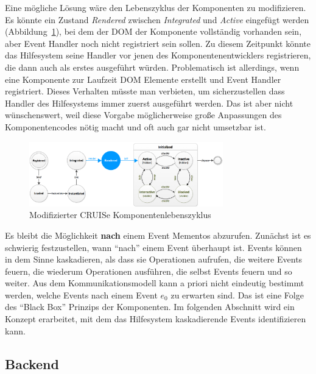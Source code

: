 \documentclass[
	headsepline,
	footsepline,
	fontsize=12pt,
	bibliography=totoc
]{scrbook}
\begin{document}
Eine mögliche Lösung wäre den Lebenszyklus der Komponenten zu modifizieren. Es könnte ein Zustand \emph{Rendered} zwischen \emph{Integrated} und \emph{Active} eingefügt werden (Abbildung~\ref{figure:cruise-lifecycle}), bei dem der DOM der Komponente vollständig vorhanden sein, aber Event Handler noch nicht registriert sein sollen. Zu diesem Zeitpunkt könnte das Hilfesystem seine Handler vor jenen des Komponentenentwicklers registrieren, die dann auch als erstes ausgeführt würden. Problematisch ist allerdings, wenn eine Komponente zur Laufzeit DOM Elemente erstellt und Event Handler registriert. Dieses Verhalten müsste man verbieten, um sicherzustellen dass Handler des Hilfesystems immer zuerst ausgeführt werden. Das ist aber nicht wünschenswert, weil diese Vorgabe möglicherweise große Anpassungen des Komponentencodes nötig macht und oft auch gar nicht umsetzbar ist.

\begin{figure}[htbp]
   \centering
   \includegraphics[width=0.75\textwidth]{images/konzeption-cruise-lifecycle.png}
   \caption{Modifizierter CRUISe Komponentenlebenszyklus}
   \label{figure:cruise-lifecycle}
\end{figure}


Es bleibt die Möglichkeit \textbf{nach} einem Event Mementos abzurufen. Zunächst ist es schwierig festzustellen, wann \enquote{nach} einem Event überhaupt ist. Events können in dem Sinne kaskadieren, als dass sie Operationen aufrufen, die weitere Events feuern, die wiederum Operationen ausführen, die selbst Events feuern und so weiter. Aus dem Kommunikationsmodell kann a priori nicht eindeutig bestimmt werden, welche Events nach einem Event $e_0$ zu erwarten sind. Das ist eine Folge des \enquote{Black Box} Prinzips der Komponenten. Im folgenden Abschnitt wird ein Konzept erarbeitet, mit dem das Hilfesystem kaskadierende Events identifizieren kann.

\subsection{Backend}

\end{document}
